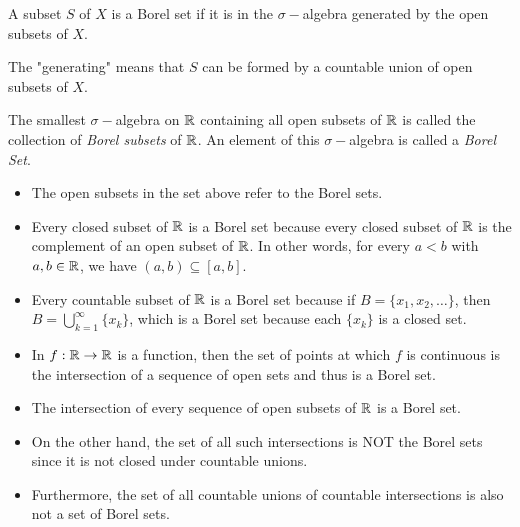 \documentclass[11pt,a4paper]{book}
\begin{document}
\begin{definition}
   A subset \( S   \) of \( X  \) is a Borel set if it is in the \( \sigma- \)algebra generated by the open subsets of \( X  \).
\end{definition}

The "generating" means that \( S  \) can be formed by a countable union of open subsets of \( X  \).

\begin{definition}
    The smallest \( \sigma- \)algebra on \( \mathbb{R}  \) containing all open subsets of \( \mathbb{R}  \) is called the collection of \textit{Borel subsets} of \( \mathbb{R}  \). An element of this \( \sigma- \)algebra is called a \textit{Borel Set}. 
\end{definition}

\begin{itemize}
    \item The open subsets in the set above refer to the Borel sets. 
\end{itemize}




\begin{eg}
   \begin{itemize}
       \item Every closed subset of \( \mathbb{R}  \) is a Borel set because every closed subset of \( \mathbb{R}  \) is the complement of an open subset of \(  \mathbb{R}  \). In other words, for every \( a < b  \) with \( a,b \in \mathbb{R}  \), we have \( (a,b) \subseteq [a,b] \).
        \item Every countable subset of \( \mathbb{R}  \) is a Borel set because if \( B = \{ {x}_{1}, {x}_{2}, \dots  \}  \), then \( B = \bigcup_{ k = 1  }^{ \infty  } \{ {x}_{k } \}  \), which is a Borel set because each \( \{ {x}_{k } \}  \) is a closed set.
        \item In \( f: \mathbb{R} \to \mathbb{R}  \) is a function, then the set of points at which \( f  \) is continuous is the intersection of a sequence of open sets and thus is a Borel set.
   \end{itemize} 
\end{eg}

\begin{itemize}
    \item The intersection of every sequence of open subsets of \( \mathbb{R}  \) is a Borel set.       \item On the other hand, the set of all such intersections is NOT the Borel sets since it is not closed under countable unions.  
    \item Furthermore, the set of all countable unions of countable intersections is also not a set of Borel sets.
\end{itemize}
\end{document}
